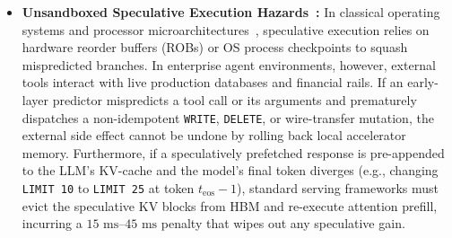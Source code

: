 \documentclass[10pt,conference]{IEEEtran}
\begin{document}
\begin{itemize}
    \item \textbf{Unsandboxed Speculative Execution Hazards~\cite{nightingale2005speculator, patil2024goex}:} In classical operating systems and processor microarchitectures~\cite{tomasulo1967efficient, nightingale2005speculator}, speculative execution relies on hardware reorder buffers (ROBs) or OS process checkpoints to squash mispredicted branches. In enterprise agent environments, however, external tools interact with live production databases and financial rails. If an early-layer predictor mispredicts a tool call or its arguments and prematurely dispatches a non-idempotent \texttt{WRITE}, \texttt{DELETE}, or wire-transfer mutation, the external side effect cannot be undone by rolling back local accelerator memory. Furthermore, if a speculatively prefetched response is pre-appended to the LLM's KV-cache and the model's final token diverges (e.g., changing \texttt{LIMIT 10} to \texttt{LIMIT 25} at token $t_{\text{eos}}-1$), standard serving frameworks must evict the speculative KV blocks from HBM and re-execute attention prefill, incurring a $15\text{ ms}$--$45\text{ ms}$ penalty that wipes out any speculative gain.
\end{itemize}
\end{document}
